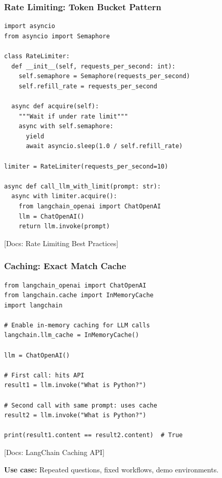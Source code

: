 \documentclass[aspectratio=169,11pt]{beamer}
\newcommand{\docref}[1]{{\scriptsize\color{docgray}[Docs: #1]}}
\begin{document}
\begin{frame}[fragile]
\frametitle{Rate Limiting: Token Bucket Pattern}

\vspace{-0.1cm}
\begin{lstlisting}
import asyncio
from asyncio import Semaphore

class RateLimiter:
  def __init__(self, requests_per_second: int):
    self.semaphore = Semaphore(requests_per_second)
    self.refill_rate = requests_per_second

  async def acquire(self):
    """Wait if under rate limit"""
    async with self.semaphore:
      yield
      await asyncio.sleep(1.0 / self.refill_rate)

limiter = RateLimiter(requests_per_second=10)

async def call_llm_with_limit(prompt: str):
  async with limiter.acquire():
    from langchain_openai import ChatOpenAI
    llm = ChatOpenAI()
    return llm.invoke(prompt)
\end{lstlisting}

\docref{Rate Limiting Best Practices}

\end{frame}

\begin{frame}[fragile]
\frametitle{Caching: Exact Match Cache}

\begin{lstlisting}
from langchain_openai import ChatOpenAI
from langchain.cache import InMemoryCache
import langchain

# Enable in-memory caching for LLM calls
langchain.llm_cache = InMemoryCache()

llm = ChatOpenAI()

# First call: hits API
result1 = llm.invoke("What is Python?")

# Second call with same prompt: uses cache
result2 = llm.invoke("What is Python?")

print(result1.content == result2.content)  # True
\end{lstlisting}
\vspace{-0.15cm}

\docref{LangChain Caching API}

\vspace{1em}

\small\textbf{Use case:} Repeated questions, fixed workflows, demo environments.

\end{frame}
\end{document}
